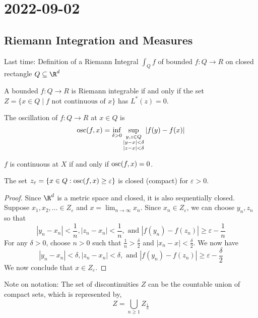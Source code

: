 \section{2022-09-02}

\subsection{Riemann Integration and Measures}
Last time: Definition of a Riemann Integral $\int_Q f$ of bounded $f : Q \to R$ on closed rectangle $Q
\subseteq \R^d$

\begin{theorem}
  A bounded $f : Q \to R$ is Riemann integrable if and only if the set $Z = \{ x \in Q \mid f
  \text{ not continuous of } x \}$ has $L^* (z) = 0$.
\end{theorem}

\begin{definition}[oscillation]
  The oscillation of $f : Q \to R$ at $x \in Q$ is
\[\operatorname*{osc}(f,x) = \inf_{\delta > 0} \sup_{\substack{y, z \in Q \\ | y - x | < \delta \\ |z - x| < \delta}} |f(y) - f(x)| \]
\end{definition}

\begin{lemma}
  $f$ is continuous at $X$ if and only if $\operatorname*{osc} (f,x) = 0$.
\end{lemma}

\begin{lemma}
  The set $z_\varepsilon = \{ x \in Q : \operatorname*{osc}(f,x) \geq \varepsilon \}$ is closed (compact) for $\varepsilon > 0$.
\end{lemma}

\begin{proof}
  Since $\R^d$ is a metric space and closed, it is also sequentially closed.
  Suppose $x_1, x_2, \ldots \in Z_\varepsilon$ and $x = \lim_{n \to \infty} x_n$.
  Since $x_n \in Z_\varepsilon$, we can choose $y_n, z_n$ so that
  \[|y_n - x_n| < \frac{1}{n}, |z_n - x_n| < \frac{1}{n}, \text{ and } |f(y_n) - f(z_n)| \geq \varepsilon - \frac{1}{n}\]
  For any $\delta > 0$, choose $n > 0$ such that $\frac{1}{n} > \frac{\delta}{2}$ and $|x_n - x| < \frac{\delta}{2}$.
  We now have
  \[|y_n - x_n| < \delta, |z_n - x_n| < \delta, \text{ and } |f(y_n) - f(z_n)| \geq \varepsilon - \frac{\delta}{2}\]
  We now conclude that $x \in Z_\varepsilon$.
\end{proof}

Note on notation: The set of discontinuities $Z$ can be the countable union of compact sets, which is represented by,
\[ Z = \bigcup_{n \geq 1} Z_{\frac{1}{n}} \]


